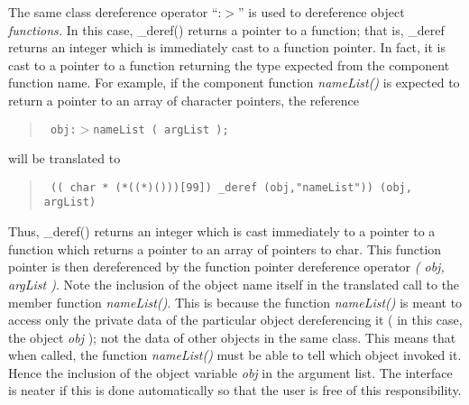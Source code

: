 The same class dereference operator ``:$>$'' is used to dereference object
{\em functions.} In this case, \_deref() returns a pointer to a function;
that is, \_deref returns an integer which is immediately cast to a function
pointer.  In fact, it is cast to a pointer to a function returning the
type expected from the component function name.  For example, if the
component function {\em nameList()} is expected to return a pointer to an
array of character pointers, the reference
\begin{quote} \tt
obj:$>$nameList ( argList );
\end{quote}
will be translated to
\begin{quote} \tt
(( char * (*((*)()))[99]) \_deref (obj,"nameList")) (obj, argList)
\end{quote}

Thus, \_deref() returns an integer which is cast immediately to a pointer to
a function which returns a pointer to an array of pointers to char.  This
function pointer is then dereferenced by the function pointer dereference
operator {\em ( obj, argList )}.   Note the inclusion of the object name itself
in the translated call to the member function {\em nameList()}.  This is because
the function {\em nameList()} is meant to access only the private data of the
particular object dereferencing it ( in this case, the object {\em obj} ); not
the data of other objects in the same class.  This means that when called,
the function {\em nameList()} must be able to tell which object invoked it.
Hence the inclusion of the object variable {\em obj} in the argument list.
The interface is neater if this is done automatically so that the user is
free of this responsibility.

